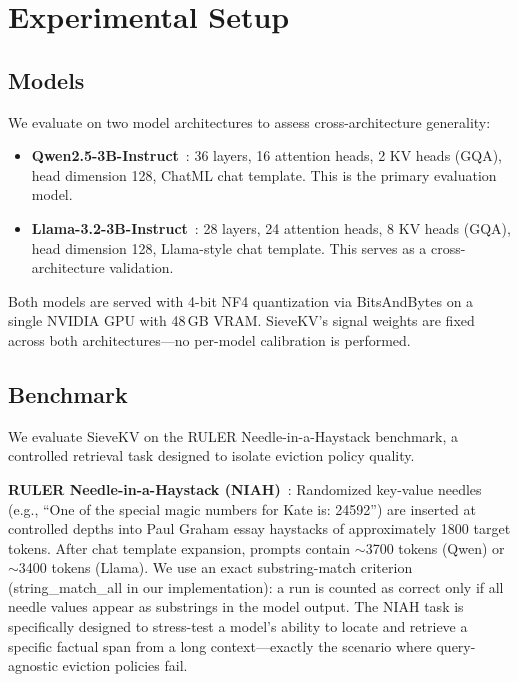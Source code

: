 \documentclass[runningheads]{llncs}
\begin{document}
\section{Experimental Setup}
\label{sec:setup}

\subsection{Models}

We evaluate on two model architectures to assess cross-architecture
generality:
\begin{itemize}
\item \textbf{Qwen2.5-3B-Instruct}~\cite{qwen2025qwen25}: 36 layers,
  16 attention heads, 2 KV heads (GQA), head dimension 128, ChatML
  chat template.
  This is the primary evaluation model.

\item \textbf{Llama-3.2-3B-Instruct}~\cite{meta2024llama32}:
  28 layers, 24 attention heads, 8 KV heads (GQA), head dimension 128,
  Llama-style chat template.
  This serves as a cross-architecture validation.
\end{itemize}

Both models are served with 4-bit NF4 quantization via BitsAndBytes on a
single NVIDIA GPU with 48\,GB VRAM.
SieveKV's signal weights are fixed across both architectures---no
per-model calibration is performed.

\subsection{Benchmark}

We evaluate SieveKV on the RULER Needle-in-a-Haystack benchmark,
a controlled retrieval task designed to isolate eviction policy quality.

\textbf{RULER Needle-in-a-Haystack (NIAH)}~\cite{hsieh2024ruler}:
Randomized key-value needles (e.g.,
``One of the special magic numbers for Kate is: 24592'') are inserted at
controlled depths into Paul Graham essay haystacks of approximately 1800
target tokens.
After chat template expansion, prompts contain ${\sim}$3700 tokens (Qwen)
or ${\sim}$3400 tokens (Llama).
We use an exact substring-match criterion (string\_match\_all in our
implementation): a run is counted as correct only if all needle values
appear as substrings in the model output.
The NIAH task is specifically designed to stress-test a model's ability to
locate and retrieve a specific factual span from a long context---exactly
the scenario where query-agnostic eviction policies fail.
\end{document}
